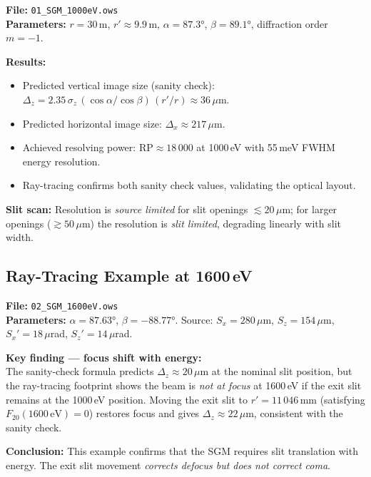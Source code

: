 \documentclass[12pt,a4paper]{article}
\newcommand{\al}{\alpha}
\newcommand{\be}{\beta}
\newcommand{\RP}{\mathrm{RP}}
\begin{document}
\begin{exbox}
\textbf{File:} \texttt{01\_SGM\_1000eV.ows}\\[4pt]
\textbf{Parameters:} $r = 30$\,m, $r' \approx 9.9$\,m, $\al = 87.3°$, $\be = 89.1°$,
diffraction order $m = -1$.

\medskip
\textbf{Results:}
\begin{itemize}
  \item Predicted vertical image size (sanity check):
        $\Delta_z = 2.35\,\sigma_z\,(\cos\al/\cos\be)\,(r'/r) \approx 36\,\mu$m.
  \item Predicted horizontal image size: $\Delta_x \approx 217\,\mu$m.
  \item Achieved resolving power: $\RP \approx 18\,000$ at 1000\,eV with 55\,meV FWHM
        energy resolution.
  \item Ray-tracing confirms both sanity check values, validating the optical layout.
\end{itemize}

\medskip
\textbf{Slit scan:} Resolution is \emph{source limited} for slit openings
$\lesssim 20\,\mu$m; for larger openings ($\gtrsim 50\,\mu$m) the resolution is
\emph{slit limited}, degrading linearly with slit width.
\end{exbox}

\subsection{Ray-Tracing Example at 1600\,eV}

\begin{exbox}
\textbf{File:} \texttt{02\_SGM\_1600eV.ows}\\[4pt]
\textbf{Parameters:} $\al = 87.63°$, $\be = -88.77°$.  Source: $S_x = 280\,\mu$m,
$S_z = 154\,\mu$m, $S_x' = 18\,\mu$rad, $S_z' = 14\,\mu$rad.

\medskip
\textbf{Key finding --- focus shift with energy:}\\
The sanity-check formula predicts $\Delta_z \approx 20\,\mu$m at the nominal slit
position, but the ray-tracing footprint shows the beam is \emph{not at focus} at 1600\,eV
if the exit slit remains at the 1000\,eV position.  Moving the exit slit to
$r' = 11\,046$\,mm (satisfying $F_{20}(1600\,\mathrm{eV}) = 0$) restores focus and
gives $\Delta_z \approx 22\,\mu$m, consistent with the sanity check.

\medskip
\textbf{Conclusion:} This example confirms that the SGM requires slit translation with
energy.  The exit slit movement \emph{corrects defocus but does not correct coma}.
\end{exbox}
\end{document}
